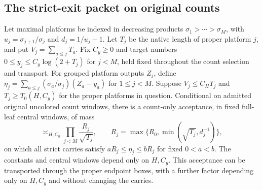 \subsection{The strict-exit packet on original counts}
\label{paper:ep-diagonal-section}
\begin{proposition}\label{paper:ep-diagonal}
Let maximal platforms be indexed in decreasing products
$\sigma_1>\cdots>\sigma_M$, with
$u_j=\sigma_{j+1}/\sigma_j$ and $d_j=1/u_j-1$.
Let $T_j$ be the native length of proper platform $j$, and put
$V_j=\sum_{a\leq j}T_a$.
Fix $C_y\geq0$ and target numbers
$0\leq y_j\leq C_y\log(2+T_j)$ for $j<M$, held fixed throughout
the count selection and transport. For grouped platform outputs $Z_j$,
define $\eta_j=\sum_{a\leq j}(\sigma_a/\sigma_j)(Z_a-y_a)$
for $1\leq j<M$.
Suppose
$V_j\leq C_HT_j$ and $T_j\geq T_0(H,C_y)$ for the proper platforms in
question.  Conditional on admitted original uncolored count windows,
there is a count-only acceptance, in fixed full-leaf central windows,
of mass
\begin{equation}\label{paper:ep-diagonal-mass}
 \asymp_{H,C_y}\prod_{j<M}\frac{R_j}{\sqrt{T_j}},\qquad
 R_j=\max\{R_0,\min(\sqrt{T_j},d_j^{-1})\},
\end{equation}
on which all strict carries satisfy
$aR_j\leq\eta_j\leq bR_j$ for fixed $0<a<b$.
The constants and central windows depend only on $H,C_y$.
This acceptance can be transported through the proper endpoint boxes,
with a further factor depending only on $H,C_y$ and without changing
the carries.
\end{proposition}

